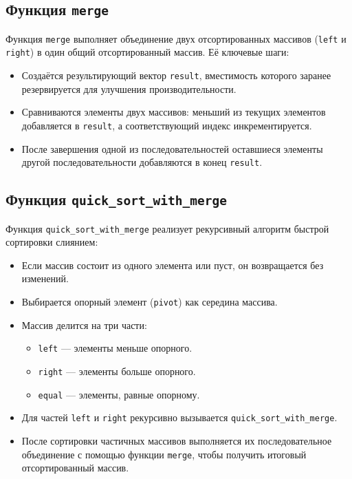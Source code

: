 \documentclass[12pt]{article}
\begin{document}
\subsection*{Функция \texttt{merge}}
Функция \texttt{merge} выполняет объединение двух отсортированных массивов (\texttt{left} и \texttt{right}) в один общий отсортированный массив. Её ключевые шаги:
\begin{itemize}
    \item Создаётся результирующий вектор \texttt{result}, вместимость которого заранее резервируется для улучшения производительности.
    \item Сравниваются элементы двух массивов: меньший из текущих элементов добавляется в \texttt{result}, а соответствующий индекс инкрементируется.
    \item После завершения одной из последовательностей оставшиеся элементы другой последовательности добавляются в конец \texttt{result}.
\end{itemize}

\subsection*{Функция \texttt{quick\_sort\_with\_merge}}
Функция \texttt{quick\_sort\_with\_merge} реализует рекурсивный алгоритм быстрой сортировки слиянием:
\begin{itemize}
    \item Если массив состоит из одного элемента или пуст, он возвращается без изменений.
    \item Выбирается опорный элемент (\texttt{pivot}) как середина массива.
    \item Массив делится на три части:
    \begin{itemize}
        \item \texttt{left} — элементы меньше опорного.
        \item \texttt{right} — элементы больше опорного.
        \item \texttt{equal} — элементы, равные опорному.
    \end{itemize}
    \item Для частей \texttt{left} и \texttt{right} рекурсивно вызывается \texttt{quick\_sort\_with\_merge}.
    \item После сортировки частичных массивов выполняется их последовательное объединение с помощью функции \texttt{merge}, чтобы получить итоговый отсортированный массив.
\end{itemize}
\end{document}
